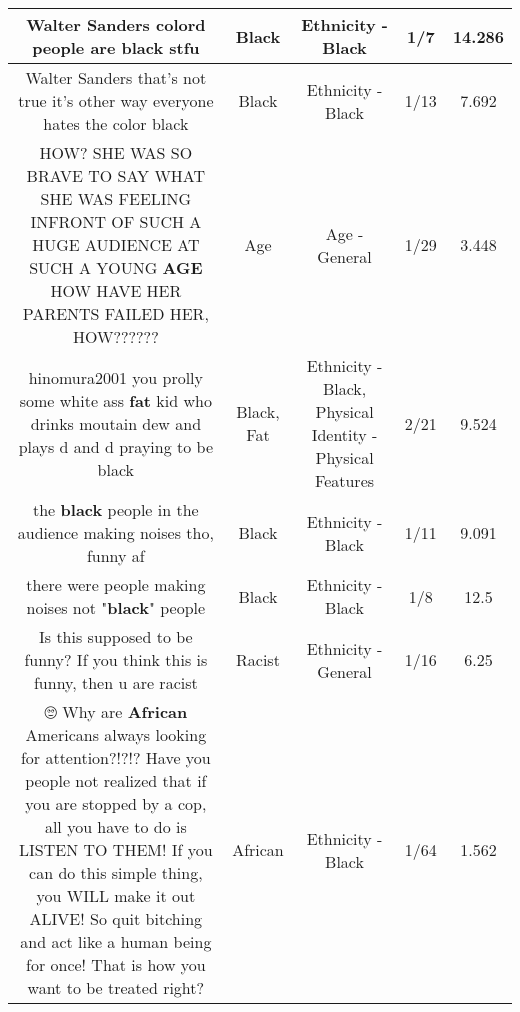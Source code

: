 \documentclass[11pt]{article}
\newlength\mylength
\begin{document}
\begin{center}
\begin{longtable}{|C{.65\mylength}|C{.30\mylength}|C{.12\mylength}|C{.12\mylength}|C{.12\mylength}|}
  \small Walter Sanders colord people are \textbf{black} stfu\normalsize   & Black & Ethnicity - Black & 1/7 & 14.286 \\  \hline
  \small Walter Sanders that's not true it's other way everyone hates the color  black\normalsize   & Black & Ethnicity - Black & 1/13 & 7.692 \\  \hline
  \small HOW? SHE WAS SO BRAVE TO SAY WHAT SHE WAS FEELING INFRONT OF SUCH A HUGE AUDIENCE AT SUCH A YOUNG \textbf{AGE} HOW HAVE HER PARENTS FAILED HER, HOW??????\normalsize   & Age & Age - General & 1/29 & 3.448 \\  \hline
  \small hinomura2001 you prolly some white ass \textbf{fat} kid who drinks moutain dew and plays d and d praying to be black\normalsize   & Black, Fat & Ethnicity - Black, Physical Identity - Physical Features & 2/21 & 9.524 \\  \hline
  \small the \textbf{black} people in the audience making noises tho, funny af\normalsize   & Black & Ethnicity - Black & 1/11 & 9.091 \\  \hline
  \small there were people making noises not "\textbf{black}" people\normalsize   & Black & Ethnicity - Black & 1/8 & 12.5 \\  \hline
  \small Is this supposed to be funny? If you think this is funny, then u are racist\normalsize   & Racist & Ethnicity - General & 1/16 & 6.25 \\  \hline
  \small 🙄 Why are \textbf{African} Americans always looking for attention?!?!? Have you people not realized that if you are stopped by a cop, all you have to do is LISTEN TO THEM! If you can do this simple thing, you WILL make it out ALIVE! So quit bitching and act like a human being for once! That is how you want to be treated right?\normalsize   & African & Ethnicity - Black & 1/64 & 1.562 \\  \hline

\end{longtable}
\end{center}
\end{document}
